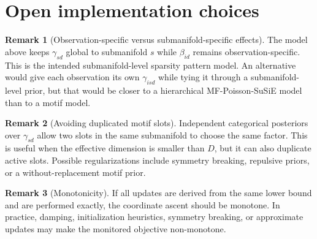 \documentclass[11pt]{article}
\theoremstyle{definition}
\newtheorem{remark}{Remark}
\begin{document}
\section{Open implementation choices}

\begin{remark}[Observation-specific versus submanifold-specific effects]
The model above keeps $\gamma_{sd}$ global to submanifold $s$ while
$\beta_{id}$ remains observation-specific. This is the intended
submanifold-level sparsity pattern model. An alternative would give each
observation its own $\gamma_{isd}$ while tying it through a submanifold-level
prior, but that would be closer to a hierarchical MF-Poisson-SuSiE model than to
a motif model.
\end{remark}

\begin{remark}[Avoiding duplicated motif slots]
Independent categorical posteriors over $\gamma_{sd}$ allow two slots in the
same submanifold to choose the same factor. This is useful when the effective
dimension is smaller than $D$, but it can also duplicate active slots. Possible
regularizations include symmetry breaking, repulsive priors, or a
without-replacement motif prior.
\end{remark}

\begin{remark}[Monotonicity]
If all updates are derived from the same lower bound and are performed exactly,
the coordinate ascent should be monotone. In practice, damping, initialization
heuristics, symmetry breaking, or approximate updates may make the monitored
objective non-monotone.
\end{remark}
\end{document}
